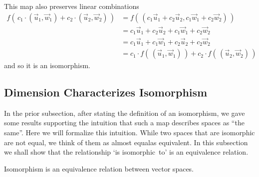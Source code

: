 \begin{exercises}
\begin{answer}
\begin{exparts}
          This map also preserves linear combinations
          \begin{align*}
            f(\,c_1\cdot(\vec{u}_1,\vec{w}_1)+c_2\cdot (\vec{u}_2,\vec{w}_2)\,)
            &=f(\,(c_1\vec{u}_1+c_2\vec{u}_2,c_1\vec{w}_1+c_2\vec{w}_2)\,) \\
            &=c_1\vec{u}_1+c_2\vec{u}_2+c_1\vec{w}_1+c_2\vec{w}_2    \\
            &=c_1\vec{u}_1+c_1\vec{w}_1+c_2\vec{u}_2+c_2\vec{w}_2    \\
            &=c_1\cdot f(\,(\vec{u}_1,\vec{w}_1)\,)
               +c_2\cdot f(\,(\vec{u}_2,\vec{w}_2)\,)
          \end{align*}
          and so it is an isomorphism.
      \end{exparts}     
    \end{answer}
\end{exercises}












\subsection{Dimension Characterizes Isomorphism}

In the prior subsection, after stating the definition of an isomorphism,
we gave some results supporting the intuition that such a map describes 
spaces as ``the same''. 
Here we will formalize this intuition.
While two spaces that are isomorphic are not equal, we think of them
as almost equal\Dash as equivalent.
In this subsection 
we shall show that the relationship `is isomorphic~to' is an equivalence
relation.

\begin{theorem}
\label{th:IsoEquivRel}
Isomorphism is an equivalence
relation between vector spaces.
\end{theorem}

